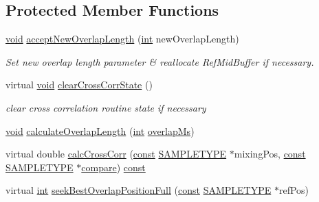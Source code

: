 \subsection*{Protected Member Functions}
\begin{DoxyCompactItemize}
\item 
\hyperlink{sound_8c_ae35f5844602719cf66324f4de2a658b3}{void} \hyperlink{classsoundtouch_1_1_t_d_stretch_a3affdc351ec41871258d62cc792a9ed6}{accept\+New\+Overlap\+Length} (\hyperlink{xmltok_8h_a5a0d4a5641ce434f1d23533f2b2e6653}{int} new\+Overlap\+Length)
\begin{DoxyCompactList}\small\item\em Set new overlap length parameter \& reallocate Ref\+Mid\+Buffer if necessary. \end{DoxyCompactList}\item 
virtual \hyperlink{sound_8c_ae35f5844602719cf66324f4de2a658b3}{void} \hyperlink{classsoundtouch_1_1_t_d_stretch_aba956f3b0bf74cc8a4b8f88f444b9161}{clear\+Cross\+Corr\+State} ()
\begin{DoxyCompactList}\small\item\em clear cross correlation routine state if necessary \end{DoxyCompactList}\item 
\hyperlink{sound_8c_ae35f5844602719cf66324f4de2a658b3}{void} \hyperlink{classsoundtouch_1_1_t_d_stretch_a4de2124e704948f2aff33ca1ee41072e}{calculate\+Overlap\+Length} (\hyperlink{xmltok_8h_a5a0d4a5641ce434f1d23533f2b2e6653}{int} \hyperlink{classsoundtouch_1_1_t_d_stretch_a8c3185aed01ad4714c68ef0f3947769d}{overlap\+Ms})
\item 
virtual double \hyperlink{classsoundtouch_1_1_t_d_stretch_a6971fa06b13399662485bc382d6d3aa1}{calc\+Cross\+Corr} (\hyperlink{getopt1_8c_a2c212835823e3c54a8ab6d95c652660e}{const} \hyperlink{namespacesoundtouch_a97cfd29a7abb4d4b2a72f803d5b5850c}{S\+A\+M\+P\+L\+E\+T\+Y\+PE} $\ast$mixing\+Pos, \hyperlink{getopt1_8c_a2c212835823e3c54a8ab6d95c652660e}{const} \hyperlink{namespacesoundtouch_a97cfd29a7abb4d4b2a72f803d5b5850c}{S\+A\+M\+P\+L\+E\+T\+Y\+PE} $\ast$\hyperlink{xlmath_8c_aa15d8309d8d26181e4cd2abe9f06ab49}{compare}) \hyperlink{getopt1_8c_a2c212835823e3c54a8ab6d95c652660e}{const} 
\item 
virtual \hyperlink{xmltok_8h_a5a0d4a5641ce434f1d23533f2b2e6653}{int} \hyperlink{classsoundtouch_1_1_t_d_stretch_af61ae5e8d25325d603fdfda9ed5e5d6f}{seek\+Best\+Overlap\+Position\+Full} (\hyperlink{getopt1_8c_a2c212835823e3c54a8ab6d95c652660e}{const} \hyperlink{namespacesoundtouch_a97cfd29a7abb4d4b2a72f803d5b5850c}{S\+A\+M\+P\+L\+E\+T\+Y\+PE} $\ast$ref\+Pos)

\end{DoxyCompactItemize}
